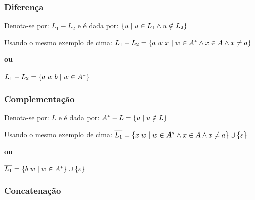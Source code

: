 \documentclass{article}
\begin{document}
\subsubsection{Diferença}

\begin{flushleft}
  \item Denota-se por: $L_1 - L_2$ e é dada por: $\{u \hspace{1mm} | \hspace{1mm} u \in L_1 \wedge u \notin L_2\}$
  \item Usando o mesmo exemplo de cima: $L_1 - L_2 = \{a \hspace{1mm} w \hspace{1mm} x \hspace{1mm} | \hspace{1mm} w \in A^* \wedge x \in A \wedge x \ne a\}$
  
  \textbf{ou}

  $L_1 - L_2 = \{a \hspace{1mm} w \hspace{1mm} b \hspace{1mm} | \hspace{1mm} w \in A^*\}$
\end{flushleft}

\subsubsection{Complementação}

\begin{flushleft}
  \item Denota-se por: $\overline{L}$ e é dada por: $A^* - L = \{u \hspace{1mm} | \hspace{1mm} u \notin L \}$
  \item Usando o mesmo exemplo de cima: $\overline{L_1} = \{x \hspace{1mm} w \hspace{1mm} | \hspace{1mm} w \in A^* \wedge x \in A \wedge x \ne a\} \cup \{\varepsilon\}$
  
  \textbf{ou}

  $\overline{L_1} = \{b \hspace{1mm} w \hspace{1mm} | \hspace{1mm} w \in A^*\} \cup \{\varepsilon\}$
\end{flushleft}

\subsubsection{Concatenação}
\end{document}
